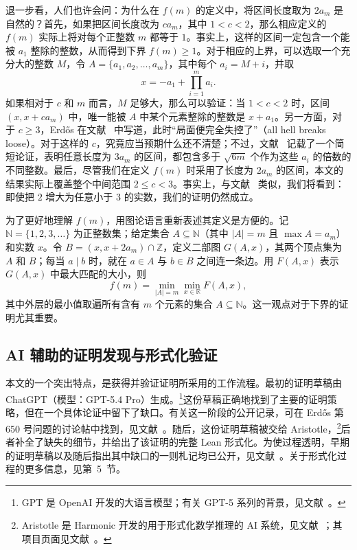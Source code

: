 \documentclass[UTF8,a4paper,oneside,openany,fontset=fandol,zihao=-4]{ctexbook}
\theoremstyle{chinesestyle}
\begin{document}
退一步看，人们也许会问：为什么在 $f(m)$ 的定义中，将区间长度取为 $2a_m$ 是自然的？首先，如果把区间长度改为 $ca_m$，其中 $1<c<2$，那么相应定义的 $f(m)$ 实际上将对每个正整数 $m$ 都等于 $1$。事实上，这样的区间一定包含一个能被 $a_1$ 整除的整数，从而得到下界 $f(m)\geq1$。对于相应的上界，可以选取一个充分大的整数 $M$，令 $A=\{a_1,a_2,\ldots,a_m\}$，其中每个 $a_i=M+i$，并取
\[
x=-a_1+\prod_{i=1}^{m}a_i.
\]
如果相对于 $c$ 和 $m$ 而言，$M$ 足够大，那么可以验证：当 $1<c<2$ 时，区间 $(x,x+ca_m)$ 中，唯一能被 $A$ 中某个元素整除的整数是 $x+a_1$。另一方面，对于 $c\geq3$，Erd\H{o}s 在文献~\cite{ref7,ref8} 中写道，此时“局面便完全失控了”（all hell breaks loose）。对于这样的 $c$，究竟应当预期什么还不清楚；不过，文献~\cite{ref8} 记载了一个简短论证，表明任意长度为 $3a_m$ 的区间，都包含多于 $\sqrt{6m}$ 个作为这些 $a_i$ 的倍数的不同整数。最后，尽管我们在定义 $f(m)$ 时采用了长度为 $2a_m$ 的区间，本文的结果实际上覆盖整个中间范围 $2\leq c<3$。事实上，与文献~\cite{ref7,ref8} 类似，我们将看到：即使把 $2$ 增大为任意小于 $3$ 的实数，我们的证明仍然成立。

为了更好地理解 $f(m)$，用图论语言重新表述其定义是方便的。记 $\mathbb N=\{1,2,3,\ldots\}$ 为正整数集；给定集合 $A\subseteq\mathbb N$（其中 $|A|=m$ 且 $\max A=a_m$）和实数 $x$。令 $B=(x,x+2a_m)\cap\mathbb Z$，定义二部图 $G(A,x)$，其两个顶点集为 $A$ 和 $B$；每当 $a\mid b$ 时，就在 $a\in A$ 与 $b\in B$ 之间连一条边。用 $F(A,x)$ 表示 $G(A,x)$ 中最大匹配的大小，则
\[
f(m)=\min_{|A|=m}\min_{x\in\mathbb R}F(A,x),
\]
其中外层的最小值取遍所有含有 $m$ 个元素的集合 $A\subseteq\mathbb N$。这一观点对于下界的证明尤其重要。

\subsection{AI 辅助的证明发现与形式化验证}

本文的一个突出特点，是获得并验证证明所采用的工作流程。最初的证明草稿由 ChatGPT（模型：GPT-5.4 Pro）生成。\footnote{GPT 是 OpenAI 开发的大语言模型；有关 GPT-5 系列的背景，见文献~\cite{ref14}。}这份草稿正确地找到了主要的证明策略，但在一个具体论证中留下了缺口。有关这一阶段的公开记录，可在 Erd\H{o}s 第 650 号问题的讨论帖中找到，见文献~\cite{ref3}。随后，这份证明草稿被交给 Aristotle，\footnote{Aristotle 是 Harmonic 开发的用于形式化数学推理的 AI 系统，见文献~\cite{ref1}；其项目页面见文献~\cite{ref11}。}后者补全了缺失的细节，并给出了该证明的完整 Lean 形式化。为使过程透明，早期的证明草稿以及随后指出其中缺口的一则札记均已公开，见文献~\cite{ref15,ref16}。关于形式化过程的更多信息，见第~5~节。
\end{document}
